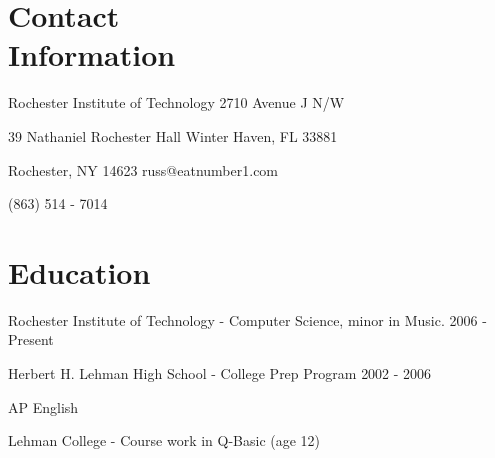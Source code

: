 \documentclass[margin,line]{resume}
\begin{document}
\begin{resume}

\section{\mysidestyle Contact \\ Information}\vspace{2mm}
	\begin{asparablank}
		\item Rochester Institute of Technology \hfill 2710 Avenue J N/W
		\item 39 Nathaniel Rochester Hall \hfill Winter Haven, FL 33881
		\item Rochester, NY 14623 \hfill russ@eatnumber1.com
		\item \hfill (863) 514 - 7014
	\end{asparablank}

\section{\mysidestyle Education}
		\begin{compactdesc}
			\item[Rochester Institute of Technology] - Computer Science, minor
			in Music. \hfill {\footnotesize 2006 - Present}
			\item[Herbert H. Lehman High School] - College Prep Program \hfill
			{\footnotesize 2002 - 2006}
			\begin{compactitem}
				\item {\small AP English}
			\end{compactitem}
			\item[Lehman College] - Course work in Q-Basic (age 12)
		\end{compactdesc}


\end{resume}
\end{document}
